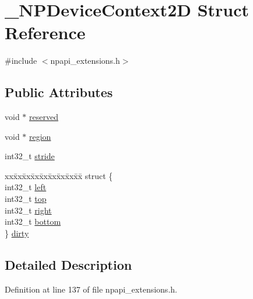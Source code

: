 \hypertarget{struct___n_p_device_context2_d}{
\section{\_\-NPDeviceContext2D Struct Reference}
\label{struct___n_p_device_context2_d}
}


{\ttfamily \#include $<$npapi\_\-extensions.h$>$}

\subsection*{Public Attributes}
\begin{DoxyCompactItemize}
\item 
void $\ast$ \hyperlink{struct___n_p_device_context2_d_a220328788843ba392656ac2f5bf244fe}{reserved}
\item 
void $\ast$ \hyperlink{struct___n_p_device_context2_d_a8ec3c876c329a4b94c6ac730d2e33885}{region}
\item 
int32\_\-t \hyperlink{struct___n_p_device_context2_d_acc18333c582d999cd4b41fac75dd7f10}{stride}
\item 
\begin{tabbing}
xx\=xx\=xx\=xx\=xx\=xx\=xx\=xx\=xx\=\kill
struct \{\\
\>int32\_t \hyperlink{struct___n_p_device_context2_d_a45321ab6f6b7280f14e9f27472f6ff69}{left}\\
\>int32\_t \hyperlink{struct___n_p_device_context2_d_a1271a86a210f0290e00457984a518bf4}{top}\\
\>int32\_t \hyperlink{struct___n_p_device_context2_d_a9ad6524791eef11231d81588ddd2344f}{right}\\
\>int32\_t \hyperlink{struct___n_p_device_context2_d_ab3eff9d7c9a0261a12cd1ac819e70d4c}{bottom}\\
\} \hyperlink{struct___n_p_device_context2_d_a078b2be40725ea8e4b1b2c500872f9af}{dirty}\\

\end{tabbing}\end{DoxyCompactItemize}


\subsection{Detailed Description}


Definition at line 137 of file npapi\_\-extensions.h.



